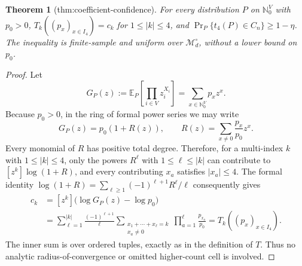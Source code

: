 \documentclass{article}
\newtheorem{theorem}{Theorem}
\begin{document}
\begin{theorem}[thm:coefficient-confidence]\label{thm:coefficient-confidence}
For every distribution \(P\) on \(\mathbb N_0^V\) with \(p_0>0\), \(T_k((p_x)_{x\in I_4})=c_k\) for \(1\le|k|\le4\), and \(\Pr_P\{t_4(P)\in C_n\}\ge1-\eta\). The inequality is finite-sample and uniform over \(\mathcal M_d^\circ\), without a lower bound on \(p_0\).
\end{theorem}
\begin{proof}
Let
\[
 G_P(z):=\mathbb E_P\!\left[\prod_{i\in V}z_i^{X_i}\right]
 =\sum_{x\in\mathbb N_0^V}p_xz^x.
\]
Because \(p_0>0\), in the ring of formal power series we may write
\[
 G_P(z)=p_0(1+R(z)),\qquad
 R(z)=\sum_{x\ne0}\frac{p_x}{p_0}z^x.
\]
Every monomial of \(R\) has positive total degree.  Therefore, for a multi-index \(k\) with \(1\le |k|\le4\), only the powers \(R^\ell\) with \(1\le\ell\le |k|\) can contribute to \([z^k]\log(1+R)\), and every contributing \(x_a\) satisfies \(|x_a|\le4\).  The formal identity \(\log(1+R)=\sum_{\ell\ge1}(-1)^{\ell+1}R^\ell/\ell\) consequently gives
\[
\begin{aligned}
 c_k
 &=[z^k]\bigl(\log G_P(z)-\log p_0\bigr)\\
 &=\sum_{\ell=1}^{|k|}\frac{(-1)^{\ell+1}}{\ell}
   \sum_{\substack{x_1+\cdots+x_\ell=k\\x_a\ne0}}
   \prod_{a=1}^{\ell}\frac{p_{x_a}}{p_0}
 =T_k((p_x)_{x\in I_4}).
\end{aligned}
\tag{11}
\]
The inner sum is over ordered tuples, exactly as in the definition of \(T\).  Thus no analytic radius-of-convergence or omitted higher-count cell is involved.


\end{proof}
\end{document}
